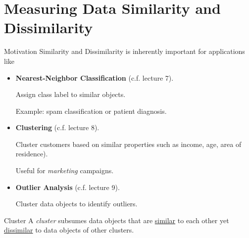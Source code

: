 \section{Measuring Data Similarity and Dissimilarity}

\begin{frame}{Motivation}
  Similarity and Dissimilarity is inherently important for applications like
  \begin{itemize}
  \item \textbf{Nearest-Neighbor Classification} (c.f. lecture 7).

    Assign class label to similar objects.

    Example: spam classification or patient diagnosis.
  \item \textbf{Clustering} (c.f. lecture 8).

    Cluster customers based on similar properties such as income, age, area of residence).

    Useful for \textit{marketing} campaigns.

  \item \textbf{Outlier Analysis} (c.f. lecture 9).

    Cluster data objects to identify outliers.
  \end{itemize}

  \begin{block}{Cluster}
    A \textit{cluster} subsumes data objects that are \underline{similar} to
    each other yet \underline{dissimilar} to data objects of other clusters.
  \end{block}

\end{frame}


